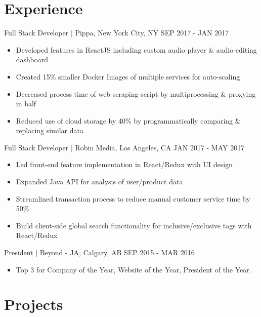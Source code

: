\documentclass[]{friggeri-cv}
\begin{document}
\section{Experience}

\begin{entrylist}
	\entry
	{Full Stack Developer | \normalfont Pippa, New York City, NY}
	{SEP 2017 - JAN 2017}
	{
		\begin{itemize}[leftmargin=*]\itemsep0.1cm
			\vspace{-0.3cm}
			\item Developed features in ReactJS including custom audio player \& audio-editing dashboard
			\item Created 15\% smaller Docker Images of multiple services for auto-scaling
			\item Decreased process time of web-scraping script by multiprocessing \& proxying in half
			\item Reduced use of cloud storage by 40\% by programmatically comparing \& replacing similar data 
		\end{itemize}
	}
	\entry
	{Full Stack Developer | \normalfont Robin Media, Los Angeles, CA}
	{JAN 2017 - MAY 2017}
	{
		\begin{itemize}[leftmargin=*]\itemsep0.1cm
			\vspace{-0.3cm}
			\item Led front-end feature implementation in React/Redux with UI design 
			\item Expanded Java API for analysis of user/product data
			\item Streamlined transaction process to reduce manual customer service time by 50\%
			\item Build client-side global search functionality for inclusive/exclusive tags with React/Redux
		\end{itemize}
	}
	\entry
	{President | \normalfont Beyond - JA, Calgary, AB}
	{SEP 2015 - MAR 2016}
	{
		\begin{itemize}[leftmargin=*]\itemsep0.1cm
			\vspace{-0.3cm}
			\item Top 3 for Company of the Year, Website of the Year, President of the Year.
		\end{itemize}
	}
\end{entrylist}

\section{Projects}
\end{document}
